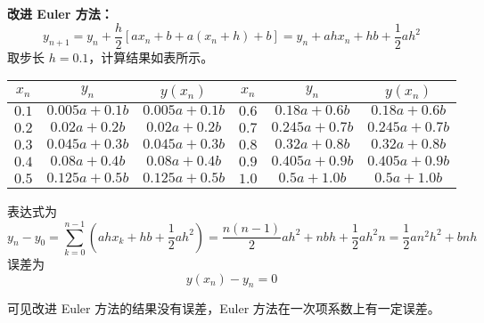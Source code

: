 \documentclass{sjtuarticle}
\begin{document}
\begin{itemize}
\begin{solution}
        \textbf{改进 Euler 方法：}
        \begin{equation*}
            y_{n+1}=y_n+\frac{h}{2}[ax_n+b+a(x_n+h)+b]=y_n+ahx_n+hb+\frac{1}{2}ah^2
        \end{equation*}
        取步长 $h=0.1$，计算结果如表所示。
        \begin{table}[h]
            \centering
            \begin{tabular}{ccc|ccc}
                \toprule
                $x_n$ & $y_n$ & $y(x_n)$ & $x_n$ & $y_n$ & $y(x_n)$ \\
                \midrule
$0.1$   & $0.005 a + 0.1 b$     & $0.005 a + 0.1 b$ & $0.6$   & $0.18 a + 0.6 b$      & $0.18 a + 0.6 b$ \\
$0.2$   & $0.02 a + 0.2 b$      & $0.02 a + 0.2 b$ & $0.7$   & $0.245 a + 0.7 b$     & $0.245 a + 0.7 b$ \\
$0.3$   & $0.045 a + 0.3 b$     & $0.045 a + 0.3 b$ & $0.8$   & $0.32 a + 0.8 b$      & $0.32 a + 0.8 b$ \\
$0.4$   & $0.08 a + 0.4 b$      & $0.08 a + 0.4 b$ & $0.9$   & $0.405 a + 0.9 b$     & $0.405 a + 0.9 b$ \\
$0.5$   & $0.125 a + 0.5 b$     & $0.125 a + 0.5 b$ & $1.0$   & $0.5 a + 1.0 b$       & $0.5 a + 1.0 b$ \\
                \bottomrule
            \end{tabular}
        \end{table}

        表达式为
        \begin{equation*}
            y_n-y_0 =\sum_{k=0}^{n-1}\left(ahx_k + hb + \frac{1}{2}ah^2\right)=\frac{n(n-1)}{2}ah^2 + nbh + \frac{1}{2}ah^2n=\frac{1}{2}an^2h^2+bnh
        \end{equation*}
        误差为
        \begin{equation*}
            y(x_n)-y_n = 0
        \end{equation*}

        可见改进 Euler 方法的结果没有误差，Euler 方法在一次项系数上有一定误差。
    \end{solution}


\end{itemize}
\end{document}
